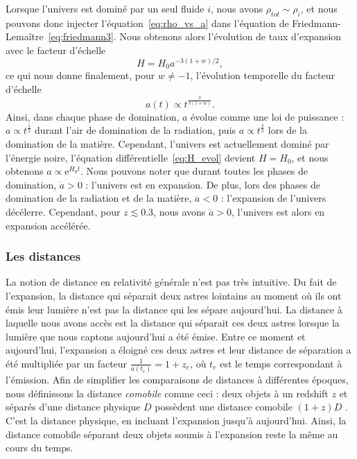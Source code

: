 \documentclass[11pt, twoside, a4paper, openright]{report}
\begin{document}
Lorsque l'univers est dominé par un seul fluide $i$, nous avons $\rho_{tot} \sim \rho_{i}$, et nous pouvons donc injecter l'équation~\ref{eq:rho_vs_a} dans l'équation de Friedmann-Lemaître~\ref{eq:friedmann3}. Nous obtenons alors l'évolution de taux d'expansion avec le facteur d'échelle
\begin{equation}
  \label{eq:H_evol}
  H = H_0 a^{-3 (1+w) / 2} ,
\end{equation}
ce qui nous donne finalement, pour $w \neq -1$, l'évolution temporelle du facteur d'échelle
\begin{equation}
  \label{eq:a_vs_t}
  a(t) \propto t^{\frac{2}{3(1+w)}} .
\end{equation}
Ainsi, dans chaque phase de domination, $a$ évolue comme une loi de puissance : $a \propto t^{\frac{1}{2}}$ durant l'air de domination de la radiation, puis $a \propto t^{\frac{2}{3}}$ lors de la domination de la matière. Cependant, l'univers est actuellement dominé par l'énergie noire, l'équation différentielle~\ref{eq:H_evol} devient $H = H_0$, et nous obtenons $a \propto \mathrm{e}^{H_{0} t}$. Nous pouvons noter que durant toutes les phases de domination, $\dot a > 0$ : l'univers est en expansion. De plus, lors des phases de domination de la radiation et de la matière, $\ddot a < 0$ : l'expansion de l'univers décélerre. Cependant, pour $ z \lesssim \num{0.3}$, nous avons $\ddot a > 0$, l'univers est alors en expansion accélérée.

\subsubsection{Les distances}
La notion de distance en relativité générale n'est pas très intuitive.
Du fait de l'expansion, la distance qui séparait deux astres lointains au moment où ils ont émis leur lumière n'est pas la distance qui les sépare aujourd'hui.
La distance à laquelle nous avons accès est la distance qui séparait ces deux astres lorsque la lumière que nous captons aujourd'hui a été émise. Entre ce moment et aujourd'hui, l'expansion a éloigné ces deux astres et leur distance de séparation a été multipliée par un facteur $\frac{1}{a(t_e)} = 1 + z_{e}$, où $t_e$ est le temps correspondant à l'émission.
Afin de simplifier les comparaisons de distances à différentes époques, nous définissons la distance \emph{comobile} comme ceci : deux objets à un redshift $z$ et séparés d'une distance physique $D$ possèdent une distance comobile $(1+z)D$ . C'est la distance physique, en incluant l'expansion jusqu'à aujourd'hui. Ainsi, la distance comobile séparant deux objets soumis à l'expansion reste la même au cours du temps.
\end{document}
